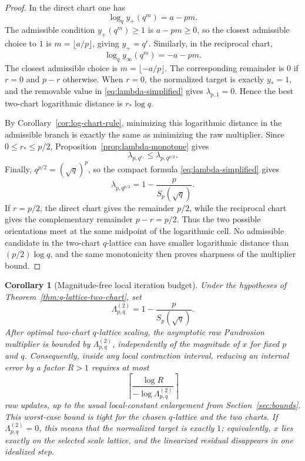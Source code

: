 \documentclass[10pt,a4paper]{article}
\theoremstyle{plain}
\newtheorem{corollary}[theorem]{Corollary}
\theoremstyle{definition}
\theoremstyle{remark}
\begin{document}
\begin{proof}
In the direct chart one has
\[
  \log_q y_+(q^m)=a-pm.
\]
The admissible condition $y_+(q^m)\ge1$ is $a-pm\ge0$, so the closest admissible
choice to $1$ is $m=\lfloor a/p\rfloor$, giving $y_+=q^r$.  Similarly, in the
reciprocal chart,
\[
  \log_q y_\infty(q^m)=-a-pm.
\]
The closest admissible choice is $m=\lfloor -a/p\rfloor$.  The corresponding
remainder is $0$ if $r=0$ and $p-r$ otherwise.  When $r=0$, the normalized
target is exactly $y_*=1$, and the removable value in
\eqref{eq:lambda-simplified} gives $\lambda_{p,1}=0$.  Hence the best
two-chart logarithmic distance is $r_*\log q$.

By Corollary~\ref{cor:log-chart-rule}, minimizing this logarithmic distance in
the admissible branch is exactly the same as minimizing the raw multiplier.
Since $0\le r_*\le p/2$, Proposition~\ref{prop:lambda-monotone} gives
\[
  \lambda_{p,q^{r_*}}\le \lambda_{p,q^{p/2}}.
\]
Finally, $q^{p/2}=(\sqrt q)^p$, so the compact formula
\eqref{eq:lambda-simplified} gives
\[
  \lambda_{p,q^{p/2}}=1-\frac{p}{S_p(\sqrt q)}.
\]
If $r=p/2$, the direct chart gives the remainder $p/2$, while the reciprocal
chart gives the complementary remainder $p-r=p/2$.  Thus the two possible
orientations meet at the same midpoint of the logarithmic cell.  No admissible
candidate in the two-chart $q$-lattice can have smaller logarithmic distance
than $(p/2)\log q$, and the same monotonicity then proves sharpness of the
multiplier bound.
\end{proof}

\begin{corollary}[Magnitude-free local iteration budget]
\label{cor:q-lattice-complexity}
Under the hypotheses of Theorem~\ref{thm:q-lattice-two-chart}, set
\[
  \Lambda_{p,q}^{(2)}=1-\frac{p}{S_p(\sqrt q)}.
\]
After optimal two-chart $q$-lattice scaling, the asymptotic raw Pandrosion
multiplier is bounded by $\Lambda_{p,q}^{(2)}$, independently of the magnitude
of $x$ for fixed $p$ and $q$.  Consequently, inside any local contraction
interval, reducing an internal error by a factor $R>1$ requires at most
\[
  \left\lceil \frac{\log R}{-\log \Lambda_{p,q}^{(2)}}\right\rceil
\]
raw updates, up to the usual local-constant enlargement from
Section~\ref{sec:bounds}.  This worst-case bound is tight for the chosen
$q$-lattice and the two charts.  If $\Lambda_{p,q}^{(2)}=0$, this means that the
normalized target is exactly $1$; equivalently, $x$ lies exactly on the selected
scale lattice, and the linearized residual disappears in one idealized step.
\end{corollary}
\end{document}
